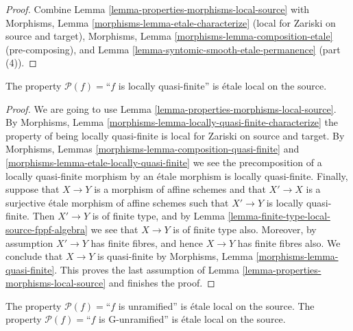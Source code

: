 \begin{proof}
Combine Lemma \ref{lemma-properties-morphisms-local-source} with
Morphisms, Lemma \ref{morphisms-lemma-etale-characterize}
(local for Zariski on source and target),
Morphisms, Lemma \ref{morphisms-lemma-composition-etale} (pre-composing), and
Lemma \ref{lemma-syntomic-smooth-etale-permanence} (part (4)).
\end{proof}

\begin{lemma}
\label{lemma-locally-quasi-finite-etale-local-source}
The property $\mathcal{P}(f)=$``$f$ is locally quasi-finite''
is \'etale local on the source.
\end{lemma}

\begin{proof}
We are going to use
Lemma \ref{lemma-properties-morphisms-local-source}.
By
Morphisms, Lemma
\ref{morphisms-lemma-locally-quasi-finite-characterize}
the property of being locally quasi-finite is local for Zariski on source
and target. By
Morphisms, Lemmas
\ref{morphisms-lemma-composition-quasi-finite} and
\ref{morphisms-lemma-etale-locally-quasi-finite}
we see the precomposition
of a locally quasi-finite morphism by an \'etale morphism is locally
quasi-finite. Finally, suppose that $X \to Y$ is a morphism of affine schemes
and that $X' \to X$ is a surjective \'etale morphism of affine schemes
such that $X' \to Y$ is locally quasi-finite. Then $X' \to Y$ is of finite
type, and by
Lemma \ref{lemma-finite-type-local-source-fppf-algebra}
we see that $X \to Y$ is of finite type also.
Moreover, by assumption $X' \to Y$ has finite fibres, and hence $X \to Y$
has finite fibres also. We conclude that $X \to Y$ is quasi-finite by
Morphisms, Lemma \ref{morphisms-lemma-quasi-finite}.
This proves the last assumption of
Lemma \ref{lemma-properties-morphisms-local-source}
and finishes the proof.
\end{proof}

\begin{lemma}
\label{lemma-unramified-etale-local-source}
The property $\mathcal{P}(f)=$``$f$ is unramified''
is \'etale local on the source.
The property $\mathcal{P}(f)=$``$f$ is G-unramified''
is \'etale local on the source.
\end{lemma}

